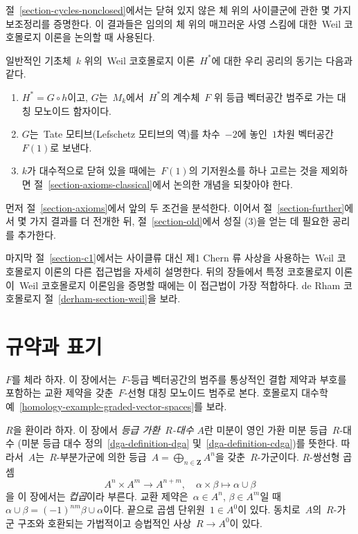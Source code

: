 \medskip\noindent
절\  \ref{section-cycles-nonclosed}에서는 닫혀 있지 않은 체 위의
사이클군에 관한 몇 가지 보조정리를 증명한다. 이 결과들은 임의의 체 위의
매끄러운 사영 스킴에 대한\  Weil 코호몰로지 이론을 논의할 때 사용된다.

\medskip\noindent
일반적인 기초체\  $k$ 위의\  Weil 코호몰로지 이론\  $H^*$에 대한 우리 공리의
동기는 다음과 같다.
\begin{enumerate}
\item $H^* = G \circ h$이고, $G$는\  $M_k$에서\  $H^*$의 계수체\  $F$ 위
등급 벡터공간 범주로 가는 대칭 모노이드 함자이다.
\item $G$는\  Tate 모티브(Lefschetz 모티브의 역)를 차수\  $-2$에 놓인\ 
$1$차원 벡터공간\  $F(1)$로 보낸다.
\item $k$가 대수적으로 닫혀 있을 때에는\  $F(1)$의 기저원소를 하나
고르는 것을 제외하면 절\  \ref{section-axioms-classical}에서 논의한
개념을 되찾아야 한다.
\end{enumerate}
먼저 절\  \ref{section-axioms}에서 앞의 두 조건을 분석한다. 이어서 절\ 
\ref{section-further}에서 몇 가지 결과를 더 전개한 뒤, 절\ 
\ref{section-old}에서 성질 (3)을 얻는 데 필요한 공리를 추가한다.

\medskip\noindent
마지막 절\  \ref{section-c1}에서는 사이클류 대신 제1 Chern 류 사상을
사용하는\  Weil 코호몰로지 이론의 다른 접근법을 자세히 설명한다. 뒤의
장들에서 특정 코호몰로지 이론이\  Weil 코호몰로지 이론임을 증명할 때에는
이 접근법이 가장 적합하다. de Rham 코호몰로지 절\ 
\ref{derham-section-weil}을 보라.





\section{규약과 표기}
\label{section-conventions}

\noindent
$F$를 체라 하자. 이 장에서는\  $F$-등급 벡터공간의 범주를 통상적인
결합 제약과 부호를 포함하는 교환 제약을 갖춘\  $F$-선형 대칭 모노이드
범주로 본다. 호몰로지 대수학 예\ 
\ref{homology-example-graded-vector-spaces}를 보라.

\medskip\noindent
$R$을 환이라 하자. 이 장에서 {\it 등급 가환\  $R$-대수} $A$란
미분이 영인 가환 미분 등급\  $R$-대수
(미분 등급 대수 정의\  \ref{dga-definition-dga} 및\ 
\ref{dga-definition-cdga})를 뜻한다. 따라서\  $A$는\  $R$-부분가군에
의한 등급\  $A = \bigoplus_{n \in \mathbf{Z}} A^n$을 갖춘\ 
$R$-가군이다. $R$-쌍선형 곱셈
$$
A^n \times A^m \longrightarrow A^{n + m},\quad
\alpha \times \beta \longmapsto \alpha \cup \beta
$$
을 이 장에서는 {\it 컵곱}이라 부른다. 교환 제약은\ 
$\alpha \in A^n$, $\beta \in A^m$일 때\ 
$\alpha \cup \beta = (-1)^{nm} \beta \cup \alpha$이다.
끝으로 곱셈 단위원\  $1 \in A^0$이 있다. 동치로\  $A$의\  $R$-가군
구조와 호환되는 가법적이고 승법적인 사상\  $R \to A^0$이 있다.


